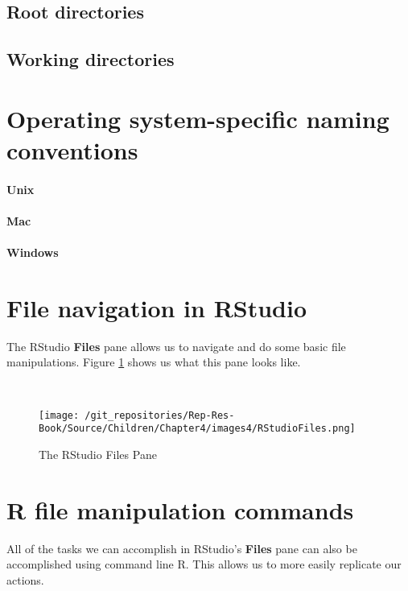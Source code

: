 \documentclass[ChapterTOCs,krantz1]{krantz}\usepackage{graphicx, color}
\begin{document}
\subsection{Root directories}

\subsection{Working directories}

\section{Operating system-specific naming conventions}

\paragraph{Unix}

\paragraph{Mac}

\paragraph{Windows}

\section{File navigation in RStudio}

The RStudio {\bf{Files}} pane allows us to navigate and do some basic file manipulations. Figure \ref{FilesPane} shows us what this pane looks like.

\begin{figure}[t!]
    \caption{The RStudio Files Pane} \\[0.25cm]
    \label{FilesPane}
        \begin{center}    
        \texttt{[image: /git\_repositories/Rep-Res-Book/Source/Children/Chapter4/images4/RStudioFiles.png]}
        \end{center}
\end{figure}

\section{R file manipulation commands}

All of the tasks we can accomplish in RStudio's {\bf{Files}} pane can also be accomplished using command line R. This allows us to more easily replicate our actions. 
\end{document}
